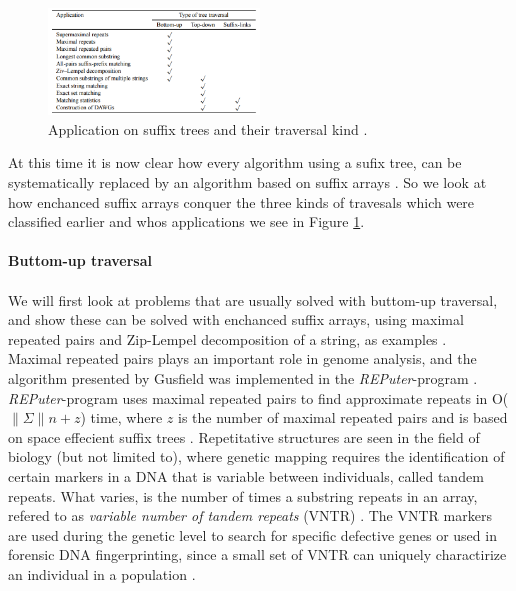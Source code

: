 \documentclass[12pt]{article} %
\begin{document}
\begin{figure}[H]
    \centering
    \includegraphics[width=0.5\textwidth]{traversalenchanced}
    \captionsetup{width=0.8\textwidth}
    \caption{Application on suffix trees and their traversal kind \cite{gusfield, enchancedsuffix}.}
    \label{fig:traversalenchanced}
\end{figure}

At this time it is now clear how every algorithm using a sufix tree, can be systematically replaced by an algorithm based on suffix arrays \cite{enchancedsuffix}. So we look at how enchanced suffix arrays conquer the three kinds of travesals which were classified earlier and whos applications we see in Figure \ref{fig:traversalenchanced}.
\\ \\
\textbf{Buttom-up traversal}
\\ \\
We will first look at problems that are usually solved with buttom-up traversal, and show these can be solved with enchanced suffix arrays, using maximal repeated pairs and Zip-Lempel decomposition of a string, as examples \cite{enchancedsuffix}.
\\
Maximal repeated pairs plays an important role in genome analysis, and the algorithm presented by Gusfield was implemented in the \emph{REPuter}-program \cite{gusfield, enchancedsuffix}. \emph{REPuter}-program uses maximal repeated pairs to find approximate repeats in O($\|\Sigma\| n + z$) time, where $z$ is the number of maximal repeated pairs and is based on space effecient suffix trees \cite{enchancedsuffix}. Repetitative structures are seen in the field of biology (but not limited to), where genetic mapping requires the identification of certain markers in a DNA that is variable between individuals, called tandem repeats. What varies, is the number of times a substring repeats in an array, refered to as \emph{variable number of tandem repeats} (VNTR) \cite{gusfield}. The VNTR markers are used during the genetic level to search for specific defective genes or used in forensic DNA fingerprinting, since a small set of VNTR can uniquely charactirize an individual in a population \cite{gusfield}. 
\end{document}
